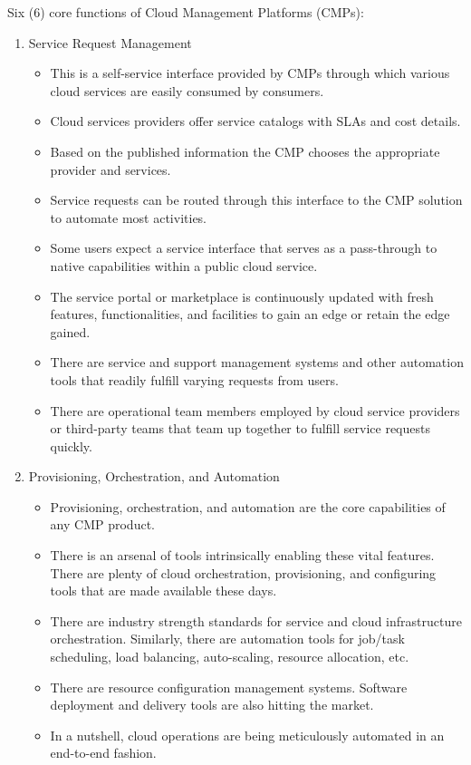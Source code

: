 \documentclass[a4paper, 12pt]{article}
\begin{document}
Six (6) core functions of Cloud Management Platforms (CMPs):
\begin{enumerate}
\item
Service Request Management
\begin{itemize}
\item
This is a self-service interface provided by CMPs through which various cloud services are easily consumed by consumers. 
\item
Cloud services providers offer service catalogs with SLAs and cost details.
\item
Based on the published information the CMP chooses the appropriate provider and services.
\item
Service requests can be routed through this interface to the CMP solution to automate most activities.
\item
Some users expect a service interface that serves as a pass-through to native capabilities within a public cloud service.
\item
The service portal or marketplace is continuously updated with fresh features, functionalities, and facilities to gain an edge or retain the edge gained.
\item
There are service and support management systems and other automation tools that readily fulfill varying requests from users.
\item
There are operational team members employed by cloud service providers or third-party teams that team up together to fulfill service requests quickly.
\end{itemize}

\item
Provisioning, Orchestration, and Automation
\begin{itemize}
\item
Provisioning, orchestration, and automation are the core capabilities of any CMP product.
\item
There is an arsenal of tools intrinsically enabling these vital features. There are plenty of cloud orchestration, provisioning, and configuring tools that are made available these days.
\item
There are industry strength standards for service and cloud infrastructure orchestration. Similarly, there are automation tools for job/task scheduling, load balancing, auto-scaling, resource allocation, etc.
\item
There are resource configuration management systems. Software deployment and delivery tools are also hitting the market.
\item
In a nutshell, cloud operations are being meticulously automated in an end-to-end fashion. 
\end{itemize}


\end{enumerate}
\end{document}
